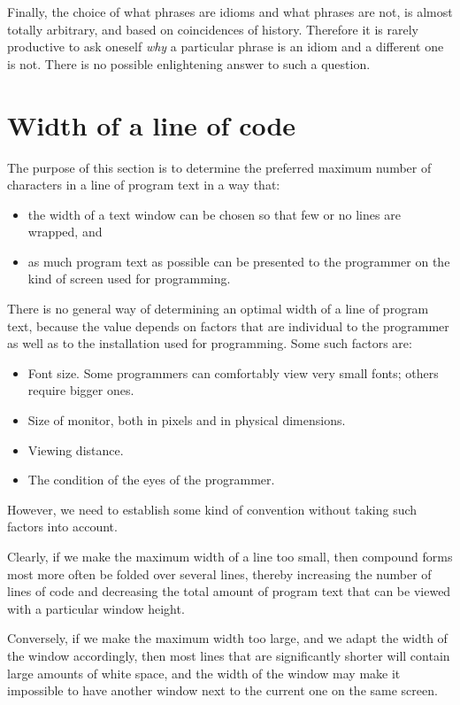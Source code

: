 Finally, the choice of what phrases are idioms and what phrases are
not, is almost totally arbitrary, and based on coincidences of
history.  Therefore it is rarely productive to ask oneself \emph{why}
a particular phrase is an idiom and a different one is not.  There is
no possible enlightening answer to such a question.


\section{Width of a line of code}

The purpose of this section is to determine the preferred maximum
number of characters in a line of program text in a way that:
\begin{itemize}
\item the width of a text window can be chosen so that few or no lines
  are wrapped, and
\item as much program text as possible can be presented to the
  programmer on the kind of screen used for programming.
\end{itemize}

There is no general way of determining an optimal width of a line of
program text, because the value depends on factors that are individual
to the programmer as well as to the installation used for programming.
Some such factors are:

\begin{itemize}
\item Font size.  Some programmers can comfortably view very small
  fonts; others require bigger ones.
\item Size of monitor, both in pixels and in physical dimensions.
\item Viewing distance.
\item The condition of the eyes of the programmer.
\end{itemize}

However, we need to establish some kind of convention without taking
such factors into account.

Clearly, if we make the maximum width of a line too small, then
compound forms most more often be folded over several lines, thereby
increasing the number of lines of code and decreasing the total amount
of program text that can be viewed with a particular window height.

Conversely, if we make the maximum width too large, and we adapt the
width of the window accordingly, then most lines that are
significantly shorter will contain large amounts of white space, and
the width of the window may make it impossible to have another window
next to the current one on the same screen.

